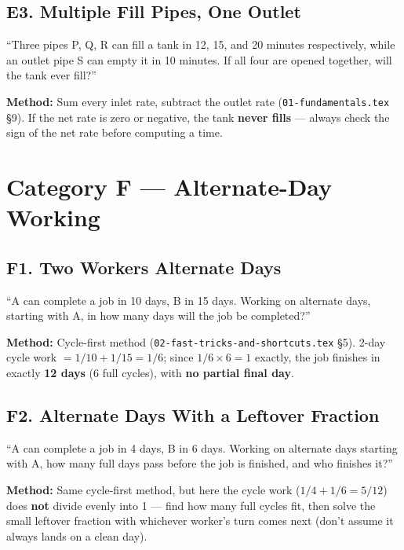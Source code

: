 \documentclass[11pt]{article}
\begin{document}
\subsection*{E3. Multiple Fill Pipes, One Outlet}
\begin{tipbox}[Phrasing]
``Three pipes P, Q, R can fill a tank in 12, 15, and 20 minutes respectively, while an outlet pipe S
can empty it in 10 minutes. If all four are opened together, will the tank ever fill?''
\end{tipbox}
\textbf{Method:} Sum every inlet rate, subtract the outlet rate (\texttt{01-fundamentals.tex} \S9).
If the net rate is zero or negative, the tank \textbf{never fills} --- always check the sign of the
net rate before computing a time.

\section*{Category F --- Alternate-Day Working}

\subsection*{F1. Two Workers Alternate Days}
\begin{tipbox}[Phrasing]
``A can complete a job in 10 days, B in 15 days. Working on alternate days, starting with A, in how
many days will the job be completed?''
\end{tipbox}
\textbf{Method:} Cycle-first method (\texttt{02-fast-tricks-and-shortcuts.tex} \S5). 2-day cycle
work $=1/10+1/15=1/6$; since $1/6\times6=1$ exactly, the job finishes in exactly \textbf{12 days} (6
full cycles), with \textbf{no partial final day}.

\subsection*{F2. Alternate Days With a Leftover Fraction}
\begin{tipbox}[Phrasing]
``A can complete a job in 4 days, B in 6 days. Working on alternate days starting with A, how many
full days pass before the job is finished, and who finishes it?''
\end{tipbox}
\textbf{Method:} Same cycle-first method, but here the cycle work ($1/4+1/6=5/12$) does
\textbf{not} divide evenly into 1 --- find how many full cycles fit, then solve the small leftover
fraction with whichever worker's turn comes next (don't assume it always lands on a clean day).
\end{document}
